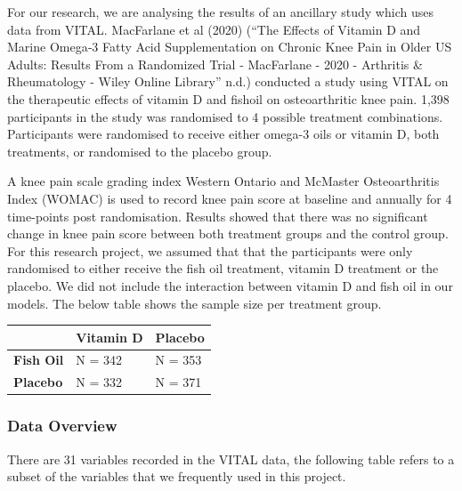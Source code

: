 \documentclass{article}
\begin{document}
For our research, we are analysing the results of an ancillary study
which uses data from VITAL. MacFarlane et al (2020) ({``The {Effects} of
{Vitamin} {D} and {Marine} {Omega}‐3 {Fatty} {Acid} {Supplementation} on
{Chronic} {Knee} {Pain} in {Older} {US} {Adults}: {Results} {From} a
{Randomized} {Trial} - {MacFarlane} - 2020 - {Arthritis} \&
{Rheumatology} - {Wiley} {Online} {Library}''} n.d.) conducted a study
using VITAL on the therapeutic effects of vitamin D and fishoil on
osteoarthritic knee pain. 1,398 participants in the study was randomised
to 4 possible treatment combinations. Participants were randomised to
receive either omega-3 oils or vitamin D, both treatments, or randomised
to the placebo group.

A knee pain scale grading index Western Ontario and McMaster
Osteoarthritis Index (WOMAC) is used to record knee pain score at
baseline and annually for 4 time-points post randomisation. Results
showed that there was no significant change in knee pain score between
both treatment groups and the control group. For this research project,
we assumed that that the participants were only randomised to either
receive the fish oil treatment, vitamin D treatment or the placebo. We
did not include the interaction between vitamin D and fish oil in our
models. The below table shows the sample size per treatment group.

\begin{longtable}[]{@{}lll@{}}
\toprule\noalign{}
& \textbf{Vitamin D} & \textbf{Placebo} \\
\midrule\noalign{}
\endhead
\bottomrule\noalign{}
\endlastfoot
\textbf{Fish Oil} & N = 342 & N = 353 \\
\textbf{Placebo} & N = 332 & N = 371 \\
\end{longtable}

\subsubsection{Data Overview}\label{data-overview-1}

There are 31 variables recorded in the VITAL data, the following table
refers to a subset of the variables that we frequently used in this
project.
\end{document}
